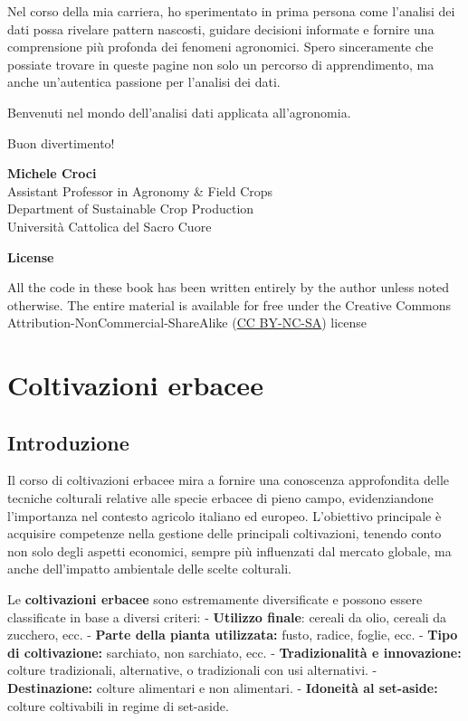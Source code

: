 \documentclass[
]{book}
\theoremstyle{definition}
\theoremstyle{definition}
\theoremstyle{definition}
\theoremstyle{definition}
\theoremstyle{remark}
\begin{document}
Nel corso della mia carriera, ho sperimentato in prima persona come l'analisi dei dati possa rivelare pattern nascosti, guidare decisioni informate e fornire una comprensione più profonda dei fenomeni agronomici. Spero sinceramente che possiate trovare in queste pagine non solo un percorso di apprendimento, ma anche un'autentica passione per l'analisi dei dati.

Benvenuti nel mondo dell'analisi dati applicata all'agronomia.

Buon divertimento!

\textbf{Michele Croci}\\
Assistant Professor in Agronomy \& Field Crops\\
Department of Sustainable Crop Production\\
Università Cattolica del Sacro Cuore

\textbf{License}

All the code in these book has been written entirely by the author unless noted otherwise. The entire material is available for free under the Creative Commons Attribution-NonCommercial-ShareAlike (\href{https://creativecommons.org/licenses/by-nc-sa/4.0/}{CC BY-NC-SA}) license

\hypertarget{coltivazioni-erbacee}{%
\chapter{Coltivazioni erbacee}\label{coltivazioni-erbacee}}

\hypertarget{introduzione}{%
\section{Introduzione}\label{introduzione}}

Il corso di coltivazioni erbacee mira a fornire una conoscenza approfondita delle tecniche colturali relative alle specie erbacee di pieno campo, evidenziandone l'importanza nel contesto agricolo italiano ed europeo. L'obiettivo principale è acquisire competenze nella gestione delle principali coltivazioni, tenendo conto non solo degli aspetti economici, sempre più influenzati dal mercato globale, ma anche dell'impatto ambientale delle scelte colturali.

Le \textbf{coltivazioni erbacee} sono estremamente diversificate e possono essere classificate in base a diversi criteri: - \textbf{Utilizzo finale}: cereali da olio, cereali da zucchero, ecc. - \textbf{Parte della pianta utilizzata:} fusto, radice, foglie, ecc. - \textbf{Tipo di coltivazione:} sarchiato, non sarchiato, ecc. - \textbf{Tradizionalità e innovazione:} colture tradizionali, alternative, o tradizionali con usi alternativi. - \textbf{Destinazione:} colture alimentari e non alimentari. - \textbf{Idoneità al set-aside:} colture coltivabili in regime di set-aside.
\end{document}
